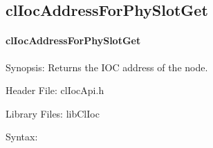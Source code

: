 \begin{flushleft}
\newpage


\subsection{clIocAddressForPhySlotGet}
\hypertarget{pageIOC128}{}\paragraph{cl\-Ioc\-Address\-For\-Phy\-Slot\-Get}\label{pageIOC128}
\begin{Desc}
\item[Synopsis: ]Returns the IOC address of the node.\end{Desc}
\begin{Desc}
\item[Header File:]clIocApi.h\end{Desc}
\begin{Desc}
\item[Library Files:]libClIoc\end{Desc}
\begin{Desc}
\item[Syntax: ]


\end{Desc}
\end{flushleft}
